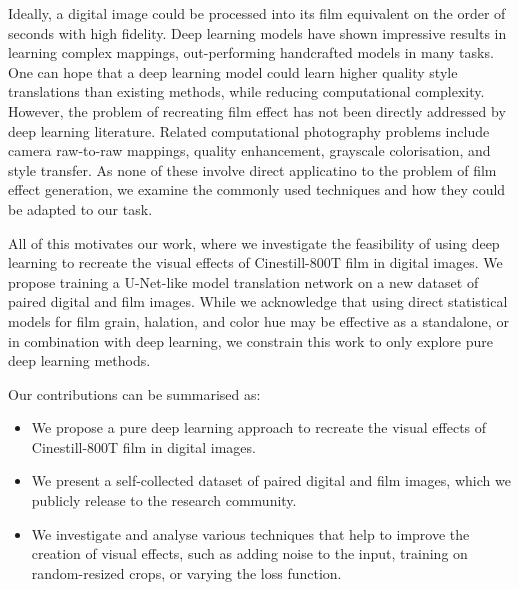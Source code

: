 Ideally, a digital image could be processed into its film equivalent on the
order of seconds with high fidelity. Deep learning models have shown impressive
results in learning complex mappings, out-performing handcrafted models in many
tasks. One can hope that a deep learning model could learn higher quality
style translations than existing methods, while reducing computational complexity.
However, the problem of recreating film effect has not been directly addressed
by deep learning literature. Related computational photography problems include
camera raw-to-raw mappings, quality enhancement, grayscale colorisation, and
style transfer. As none of these involve direct applicatino to the problem of film
effect generation, we examine the commonly used techniques and how they could be adapted to our task.

All of this motivates our work, where we investigate the feasibility of using
deep learning to recreate the visual effects of Cinestill-800T film in digital
images. We propose training a U-Net-like model translation network on a
new dataset of paired digital and film images. While we acknowledge
that using direct statistical models for film grain, halation, and color hue may
be effective as a standalone, or in combination with deep learning, we constrain
this work to only explore pure deep learning methods.

Our contributions can be summarised as:

\begin{itemize}
    \item We propose a pure deep learning approach to recreate the visual effects of Cinestill-800T film in digital images.
    \item We present a self-collected dataset of paired digital and film images, which we publicly release to the research community.
    \item We investigate and analyse various techniques that help to improve the creation of visual effects, such as adding noise to the input, training on random-resized crops, or varying the loss function.
\end{itemize}